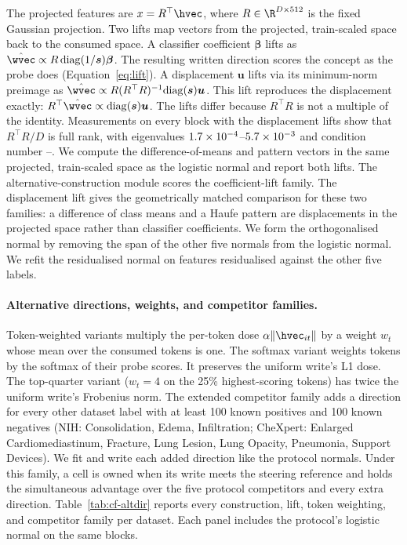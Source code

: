 The projected features are $x=R^{\top}\hvec$, where $R\in\R^{D\times512}$ is the fixed Gaussian projection. Two lifts map vectors from the projected, train-scaled space back to the consumed space. A classifier coefficient $\boldsymbol\beta$ lifts as $\hat\wvec\propto R\,\mathrm{diag}(1/\boldsymbol s)\boldsymbol\beta$. The resulting written direction scores the concept as the probe does (Equation~\ref{eq:lift}). A displacement $\boldsymbol u$ lifts via its minimum-norm preimage as $\hat\wvec\propto R(R^{\top}R)^{-1}\mathrm{diag}(\boldsymbol s)\boldsymbol u$. This lift reproduces the displacement exactly: $R^{\top}\hat\wvec\propto\mathrm{diag}(\boldsymbol s)\boldsymbol u$. The lifts differ because $R^{\top}R$ is not a multiple of the identity. Measurements on every block with the displacement lifts show that $R^{\top}R/D$ is full rank, with eigenvalues $1.7\times10^{-4}$--$5.7\times10^{-3}$ and condition number \cfAltdirdCondMin{}--\cfAltdirdCondMax{}. We compute the difference-of-means and pattern vectors in the same projected, train-scaled space as the logistic normal and report both lifts. The alternative-construction module scores the coefficient-lift family. The displacement lift gives the geometrically matched comparison for these two families: a difference of class means and a Haufe pattern are displacements in the projected space rather than classifier coefficients. We form the orthogonalised normal by removing the span of the other five normals from the logistic normal. We refit the residualised normal on features residualised against the other five labels.

\paragraph{Alternative directions, weights, and competitor families.} Token-weighted variants multiply the per-token dose $\alpha\lVert\hvec_{it}\rVert$ by a weight $w_t$ whose mean over the consumed tokens is one. The softmax variant weights tokens by the softmax of their probe scores. It preserves the uniform write's L1 dose. The top-quarter variant ($w_t=4$ on the 25\% highest-scoring tokens) has twice the uniform write's Frobenius norm. The extended competitor family adds a direction for every other dataset label with at least 100 known positives and 100 known negatives (NIH: Consolidation, Edema, Infiltration; CheXpert: Enlarged Cardiomediastinum, Fracture, Lung Lesion, Lung Opacity, Pneumonia, Support Devices). We fit and write each added direction like the protocol normals. Under this family, a cell is owned when its write meets the steering reference and holds the simultaneous advantage over the five protocol competitors and every extra direction. Table~\ref{tab:cf-altdir} reports every construction, lift, token weighting, and competitor family per dataset. Each panel includes the protocol's logistic normal on the same blocks.

